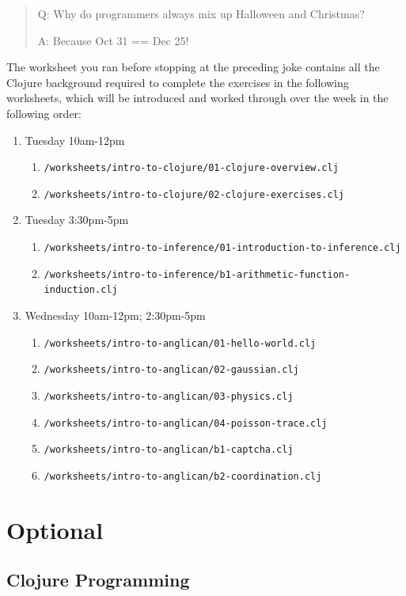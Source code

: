 \documentclass{article}
\begin{document}
\begin{quote}
Q: Why do programmers always mix up Halloween and Christmas?

A: Because Oct 31 == Dec 25!
\end{quote}
\newpage

The worksheet you ran before stopping at the preceding joke contains all the Clojure background required to
complete the exercises in the following worksheets, which will be introduced and worked through over the week in the following order:

\begin{enumerate}
\item Tuesday 10am-12pm
\begin{enumerate}
\item  \texttt{/worksheets/intro-to-clojure/01-clojure-overview.clj}
\item  \texttt{/worksheets/intro-to-clojure/02-clojure-exercises.clj}
\end{enumerate}
\item Tuesday 3:30pm-5pm
\begin{enumerate}
\item  \texttt{/worksheets/intro-to-inference/01-introduction-to-inference.clj}
\item  \texttt{/worksheets/intro-to-inference/b1-arithmetic-function-induction.clj}
\end{enumerate}
\item Wednesday 10am-12pm; 2:30pm-5pm
\begin{enumerate}
\item  \texttt{/worksheets/intro-to-anglican/01-hello-world.clj}
\item  \texttt{/worksheets/intro-to-anglican/02-gaussian.clj}		
\item  \texttt{/worksheets/intro-to-anglican/03-physics.clj}		
\item  \texttt{/worksheets/intro-to-anglican/04-poisson-trace.clj}
\item  \texttt{/worksheets/intro-to-anglican/b1-captcha.clj}
\item  \texttt{/worksheets/intro-to-anglican/b2-coordination.clj}
\end{enumerate}
\end{enumerate}


\section{Optional}


\subsection{Clojure Programming}
\end{document}
